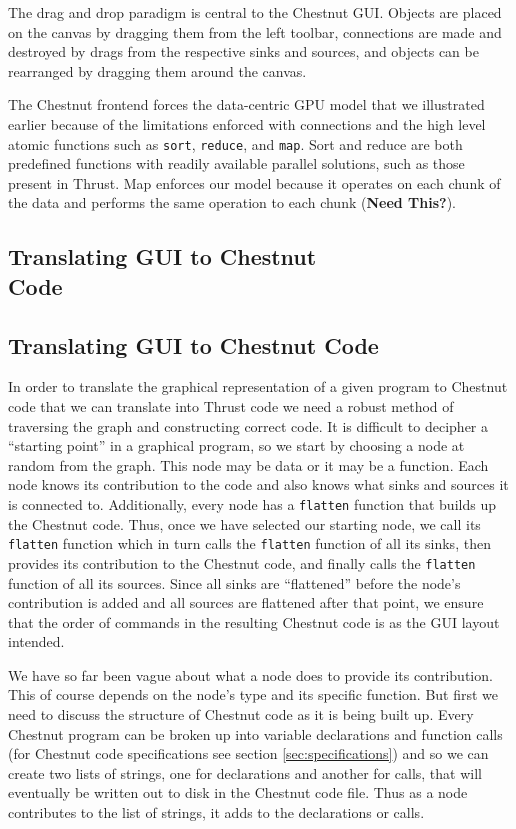 \documentclass[twocolumn]{article}
\renewcommand{\|}{\origbar} %
\newcommand{\code}[1]{\texttt{#1}}
\begin{document}
The drag and drop paradigm is central to the Chestnut GUI. Objects are placed on the canvas by dragging them from the left toolbar, connections are made and destroyed by drags from the respective sinks and sources, and objects can be rearranged by dragging them around the canvas. 

The Chestnut frontend forces the data-centric GPU model that we illustrated earlier because of the limitations enforced with connections and the high level atomic functions such as \code{sort}, \code{reduce}, and \code{map}. Sort and reduce are both predefined functions with readily available parallel solutions, such as those present in Thrust. Map enforces our model because it operates on each chunk of the data and performs the same operation to each chunk ({\bf Need This?}).

\if@twocolumn
\subsection{Translating GUI to Chestnut \\ Code}
\else
\subsection{Translating GUI to Chestnut Code} 
\fi

In order to translate the graphical representation of a given program to Chestnut code that we can translate into Thrust code we need a robust method of traversing the graph and constructing correct code. It is difficult to decipher a ``starting point'' in a graphical program, so we start by choosing a node at random from the graph. This node may be data or it may be a function. Each node knows its contribution to the code and also knows what sinks and sources it is connected to. Additionally, every node has a \code{flatten} function that builds up the Chestnut code. Thus, once we have selected our starting node, we call its \code{flatten} function which in turn calls the \code{flatten} function of all its sinks, then provides its contribution to the Chestnut code, and finally calls the \code{flatten} function of all its sources. Since all sinks are ``flattened'' before the node's contribution is added and all sources are flattened after that point, we ensure that the order of commands in the resulting Chestnut code is as the GUI layout intended.

We have so far been vague about what a node does to provide its contribution. This of course depends on the node's type and its specific function. But first we need to discuss the structure of Chestnut code as it is being built up. Every Chestnut program can be broken up into variable declarations and function calls (for Chestnut code specifications see section \ref{sec:specifications}) and so we can create two lists of strings, one for declarations and another for calls, that will eventually be written out to disk in the Chestnut code file. Thus as a node contributes to the list of strings, it adds to the declarations or calls. 
\end{document}
